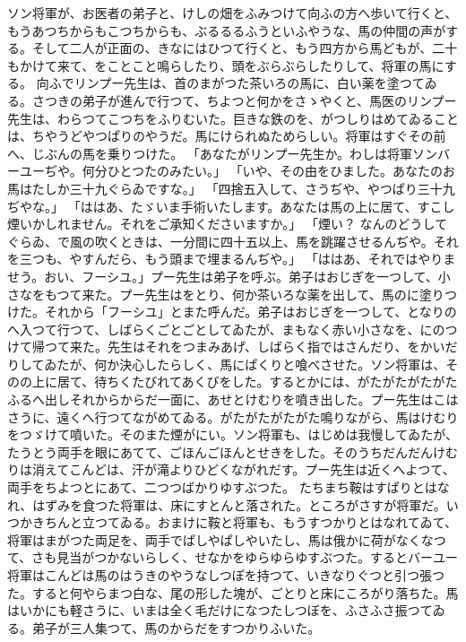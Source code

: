 \documentclass[a4paper,
tate,
book]
{jlreq}
\begin{document}
  ソン将軍が、お医者の弟子と、けしの畑をふみつけて向ふの方へ歩いて行くと、もうあつちからもこつちからも、ぶるるるふうといふやうな、馬の仲間の声がする。そして二人が正面の、きなにはひつて行くと、もう四方から馬どもが、二十もかけて来て、をことこと鳴らしたり、頭をぶらぶらしたりして、将軍の馬にする。
  向ふでリンプー先生は、首のまがつた茶いろの馬に、白い薬を塗つてゐる。さつきの弟子が進んで行つて、ちよつと何かをさゝやくと、馬医のリンプー先生は、わらつてこつちをふりむいた。巨きな鉄のを、がつしりはめてゐることは、ちやうどやつぱりのやうだ。馬にけられぬためらしい。将軍はすぐその前へ、じぶんの馬を乗りつけた。
「あなたがリンプー先生か。わしは将軍ソンバーユーぢや。何分ひとつたのみたい。」
「いや、その由をひました。あなたのお馬はたしか三十九ぐらゐですな。」
「四捨五入して、さうぢや、やつぱり三十九ぢやな。」
「ははあ、たゞいま手術いたします。あなたは馬の上に居て、すこし煙いかしれません。それをご承知くださいますか。」
「煙い？  なんのどうしてぐらゐ、で風の吹くときは、一分間に四十五以上、馬を跳躍させるんぢや。それを三つも、やすんだら、もう頭まで埋まるんぢや。」
「ははあ、それではやりませう。おい、フーシユ。」プー先生は弟子を呼ぶ。弟子はおじぎを一つして、小さなをもつて来た。プー先生はをとり、何か茶いろな薬を出して、馬のに塗りつけた。それから「フーシユ」とまた呼んだ。弟子はおじぎを一つして、となりのへ入つて行つて、しばらくごとごとしてゐたが、まもなく赤い小さなを、にのつけて帰つて来た。先生はそれをつまみあげ、しばらく指ではさんだり、をかいだりしてゐたが、何か決心したらしく、馬にぱくりと喰べさせた。ソン将軍は、そのの上に居て、待ちくたびれてあくびをした。するとかには、がたがたがたがたふるへ出しそれからからだ一面に、あせとけむりを噴き出した。プー先生はこはさうに、遠くへ行つてながめてゐる。がたがたがたがた鳴りながら、馬はけむりをつゞけて噴いた。そのまた煙がにい。ソン将軍も、はじめは我慢してゐたが、たうとう両手を眼にあてて、ごほんごほんとせきをした。そのうちだんだんけむりは消えてこんどは、汗が滝よりひどくながれだす。プー先生は近くへよつて、両手をちよつとにあて、二つつばかりゆすぶつた。
  たちまち鞍はすぱりとはなれ、はずみを食つた将軍は、床にすとんと落された。ところがさすが将軍だ。いつかきちんと立つてゐる。おまけに鞍と将軍も、もうすつかりとはなれてゐて、将軍はまがつた両足を、両手でぱしやぱしやいたし、馬は俄かに荷がなくなつて、さも見当がつかないらしく、せなかをゆらゆらゆすぶつた。するとバーユー将軍はこんどは馬のはうきのやうなしつぽを持つて、いきなりぐつと引つ張つた。すると何やらまつ白な、尾の形した塊が、ごとりと床にころがり落ちた。馬はいかにも軽さうに、いまは全く毛だけになつたしつぼを、ふさふさ振つてゐる。弟子が三人集つて、馬のからだをすつかりふいた。
\end{document}
